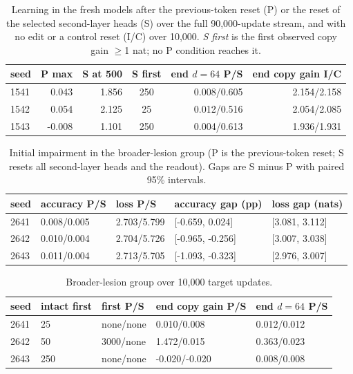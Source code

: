 \begin{table}[!htbp]
\centering\small
\caption{Learning in the fresh models after the previous-token reset (P) or the
reset of the selected second-layer heads (S) over the full 90,000-update stream, and
with no edit or a control reset (I/C) over 10,000. \emph{S first} is the first
observed copy gain $\ge$1 nat; no P condition reaches it.}
\label{tab:mfc_recovery}
\begin{tabular}{lrrcrr}\toprule
seed & P max & S at 500 & S first & end $d{=}64$ P/S & end copy gain I/C\\\midrule
1541 & 0.043 & 1.856 & 250 & 0.008/0.605 & 2.154/2.158 \\
1542 & 0.054 & 2.125 & 25 & 0.012/0.516 & 2.054/2.085 \\
1543 & -0.008 & 1.101 & 250 & 0.004/0.613 & 1.936/1.931 \\
\bottomrule\end{tabular}
\end{table}

\begin{table}[!htbp]
\centering\small
\caption{Initial impairment in the broader-lesion group (P is the previous-token
reset; S resets all second-layer heads and the readout). Gaps are S minus P with
paired 95\% intervals.}
\label{tab:dominanceinitial}
\begin{tabular}{@{}lllll@{}}\toprule
seed & accuracy P/S & loss P/S & accuracy gap (pp) & loss gap (nats) \\
\midrule
2641 & 0.008/0.005 & 2.703/5.799 & [-0.659, 0.024] & [3.081, 3.112] \\
2642 & 0.010/0.004 & 2.704/5.726 & [-0.965, -0.256] & [3.007, 3.038] \\
2643 & 0.011/0.004 & 2.713/5.705 & [-1.093, -0.323] & [2.976, 3.007] \\
\bottomrule\end{tabular}
\end{table}

\begin{table}[!htbp]
\centering\small
\caption{Broader-lesion group over 10,000 target updates.}
\label{tab:dominancerecovery}
\begin{tabular}{@{}lllll@{}}\toprule
seed & intact first & first P/S & end copy gain P/S & end $d{=}64$ P/S \\
\midrule
2641 & 25 & none/none & 0.010/0.008 & 0.012/0.012 \\
2642 & 50 & 3000/none & 1.472/0.015 & 0.363/0.023 \\
2643 & 250 & none/none & -0.020/-0.020 & 0.008/0.008 \\
\bottomrule\end{tabular}
\end{table}


